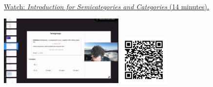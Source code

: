 
\begin{minipage}{10cm}
    \href{https://act4e-spring21.netlify.app/videos/spring2021-semicats-cats:intro_semi_cat.html}{Watch: \emph{Introduction for Semicategories and Categories} (14 minutes).}
        
    \href{https://act4e-spring21.netlify.app/videos/spring2021-semicats-cats:intro_semi_cat.html}{\includegraphics[height=3.5cm]{spring2021-semicats-cats:intro_semi_cat/thumbnails.jpg}}
    \href{https://act4e-spring21.netlify.app/videos/spring2021-semicats-cats:intro_semi_cat.html}{\includegraphics[height=2.5cm]{spring2021-semicats-cats:intro_semi_cat/qrcode.png}}
\end{minipage}
